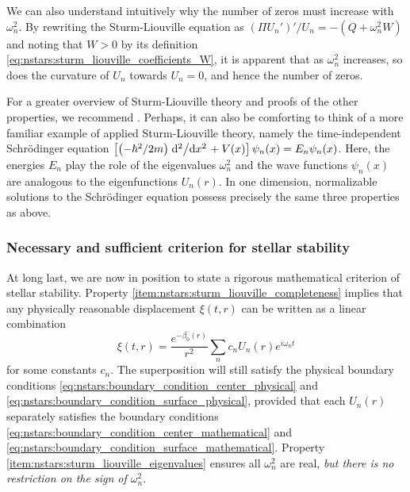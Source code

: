 We can also understand intuitively why the number of zeros must increase with $\omega_n^2$.
By rewriting the Sturm-Liouville equation as $\left( \Pi U_n' \right)' / U_n = - \left( Q + \omega_n^2 W \right)$ and noting that $W > 0$ by its definition \eqref{eq:nstars:sturm_liouville_coefficients_W}, it is apparent that as $\omega_n^2$ increases, so does the curvature of $U_n$ towards $U_n = 0$, and hence the number of zeros.

For a greater overview of Sturm-Liouville theory and proofs of the other properties, we recommend \cite{ref:morse_feshbach}.
Perhaps, it can also be comforting to think of a more familiar example of applied Sturm-Liouville theory, namely the time-independent Schrödinger equation $\left[ \left(-\hbar^2/2m\right)\odv[2]{}/{x} + V(x) \right] \psi_n(x) = E_n \psi_n(x)$.
Here, the energies $E_n$ play the role of the eigenvalues $\omega_n^2$ and the wave functions $\psi_n(x)$ are analogous to the eigenfunctions $U_n(r)$.
In one dimension, normalizable solutions to the Schrödinger equation possess precisely the same three properties as above.

\iffalse
We can give a quick proof of the first part.
Property \eqref{eq:nstars:inner_product_hermitean} implies that $-\omega_n^2 \braket{W U_n  | U_m} = -\omega_m^2 \braket{W U_m | U_n}$, so $\left( \omega_m^2 - \omega_n^2 \right) \braket{W U_m | U_n} = 0$.
If $U_m = U_n$ are equal, then $\braket{W U_m | U_n} \neq 0$, so $\omega_m^2 = \omega_n^2$ must be equal.
On the other hand, if $\omega_m^2 \neq \omega_n^2$, then $\braket{W U_m | U_n} = 0$, and $U_m \neq U_n$ must be different.
\fi

\subsubsection{Necessary and sufficient criterion for stellar stability}

At long last, we are now in position to state a rigorous mathematical criterion of stellar stability.
Property \ref{item:nstars:sturm_liouville_completeness} implies that any physically reasonable displacement $\xi(t,r)$ can be written as a linear combination
\begin{equation}
	\xi(t,r) = \frac{e^{-\beta_0(r)}}{r^2} \sum_n c_n U_n(r) e^{i \omega_n t}
\label{eq:nstars:displacement_general_solution}
\end{equation}
for some constants $c_n$.
The superposition will still satisfy the physical boundary conditions \eqref{eq:nstars:boundary_condition_center_physical} and \eqref{eq:nstars:boundary_condition_surface_physical}, provided that each $U_n(r)$ separately satisfies the boundary conditions \eqref{eq:nstars:boundary_condition_center_mathematical} and \eqref{eq:nstars:boundary_condition_surface_mathematical}.
Property \ref{item:nstars:sturm_liouville_eigenvalues} ensures all $\omega_n^2$ are real, \emph{but there is no restriction on the sign of $\omega_n^2$}.

